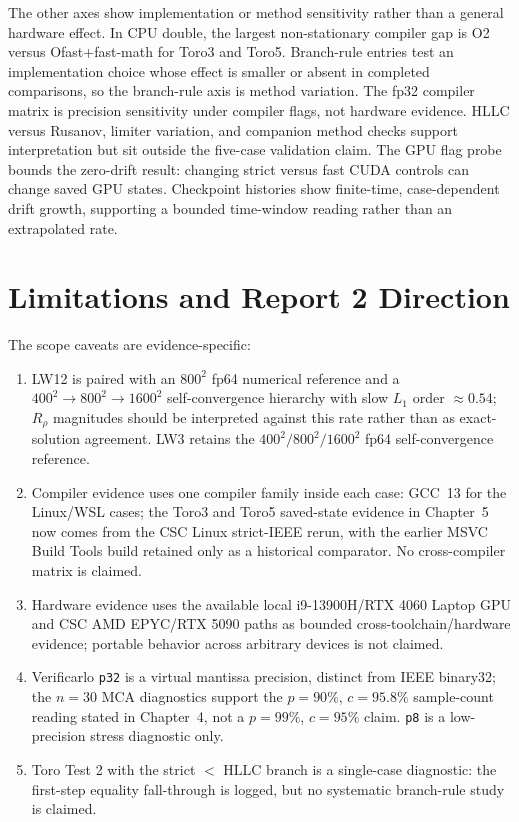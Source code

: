 The other axes show implementation or method sensitivity rather than a general hardware effect. In CPU double, the largest non-stationary compiler gap is O2 versus Ofast+fast-math for Toro3 and Toro5. Branch-rule entries test an implementation choice whose effect is smaller or absent in completed comparisons, so the branch-rule axis is method variation. The fp32 compiler matrix is precision sensitivity under compiler flags, not hardware evidence. HLLC versus Rusanov, limiter variation, and companion method checks support interpretation but sit outside the five-case validation claim. The GPU flag probe bounds the zero-drift result: changing strict versus fast CUDA controls can change saved GPU states. Checkpoint histories show finite-time, case-dependent drift growth, supporting a bounded time-window reading rather than an extrapolated rate.

\section{Limitations and Report 2 Direction}
\label{sec:ch6-limits}
The scope caveats are evidence-specific:
\begin{enumerate}
  \item LW12 is paired with an \(800^2\) fp64 numerical reference and a
        \(400^2 \to 800^2 \to 1600^2\) self-convergence hierarchy with slow
        \(L_1\) order \(\approx 0.54\); \(R_\rho\) magnitudes should be
        interpreted against this rate rather than as exact-solution agreement.
        LW3 retains the \(400^2/800^2/1600^2\) fp64 self-convergence
        reference.
  \item Compiler evidence uses one compiler family inside each case: GCC~13
        for the Linux/WSL cases; the Toro3 and Toro5 saved-state evidence in
        Chapter~5 now comes from the CSC Linux strict-IEEE rerun, with the
        earlier MSVC Build Tools build retained only as a historical
        comparator. No cross-compiler matrix is claimed.
  \item Hardware evidence uses the available local i9-13900H/RTX 4060 Laptop
        GPU and CSC AMD EPYC/RTX 5090 paths as bounded cross-toolchain/hardware
        evidence; portable behavior across arbitrary devices is not claimed.
  \item Verificarlo \texttt{p32} is a virtual mantissa precision, distinct
        from IEEE binary32; the $n=30$ MCA diagnostics support the
        \(p=90\%\), \(c=95.8\%\) sample-count reading stated in Chapter~4, not a
        \(p=99\%\), \(c=95\%\) claim. \texttt{p8} is a low-precision stress
        diagnostic only.
  \item Toro Test 2 with the strict \(<\) HLLC branch is a single-case
        diagnostic: the first-step equality fall-through is logged, but no
        systematic branch-rule study is claimed.
\end{enumerate}

